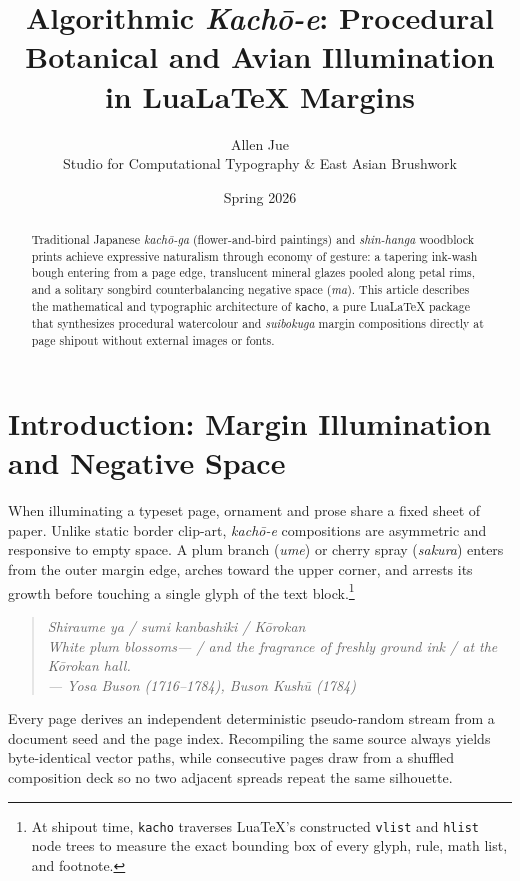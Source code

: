 \documentclass[11pt,a4paper,twoside]{article}
\title{\textbf{Algorithmic \emph{Kach\=o-e}: Procedural Botanical and Avian Illumination in Lua\LaTeX{} Margins}}
\author{Allen Jue\\ \small Studio for Computational Typography \& East Asian Brushwork}
\date{Spring 2026}
\begin{document}
\maketitle

\begin{abstract}
Traditional Japanese \emph{kach\=o-ga} (flower-and-bird paintings) and \emph{shin-hanga} woodblock prints achieve expressive naturalism through economy of gesture: a tapering ink-wash bough entering from a page edge, translucent mineral glazes pooled along petal rims, and a solitary songbird counterbalancing negative space (\emph{ma}). This article describes the mathematical and typographic architecture of \texttt{kacho}, a pure Lua\LaTeX{} package that synthesizes procedural watercolour and \emph{suibokuga} margin compositions directly at page shipout without external images or fonts.
\end{abstract}

\section{Introduction: Margin Illumination and Negative Space}

When illuminating a typeset page, ornament and prose share a fixed sheet of paper. Unlike static border clip-art, \emph{kach\=o-e} compositions are asymmetric and responsive to empty space. A plum branch (\emph{ume}) or cherry spray (\emph{sakura}) enters from the outer margin edge, arches toward the upper corner, and arrests its growth before touching a single glyph of the text block.\footnote{At shipout time, \texttt{kacho} traverses Lua\TeX's constructed \texttt{vlist} and \texttt{hlist} node trees to measure the exact bounding box of every glyph, rule, math list, and footnote.}

\begin{quote}
\itshape
Shiraume ya / sumi kanbashiki / K\=orokan\\[2pt]
White plum blossoms--- / and the fragrance of freshly ground ink / at the K\=orokan hall.\\[2pt]
\upshape\small --- Yosa Buson (1716--1784), \emph{Buson Kush\=u} (1784)
\end{quote}

Every page derives an independent deterministic pseudo-random stream from a document seed and the page index. Recompiling the same source always yields byte-identical vector paths, while consecutive pages draw from a shuffled composition deck so no two adjacent spreads repeat the same silhouette.
\end{document}
